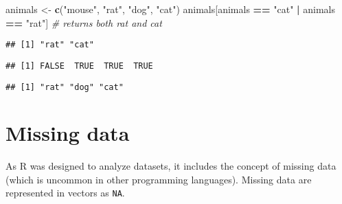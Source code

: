\documentclass[]{book}
\newenvironment{Shaded}{\begin{snugshade}}{\end{snugshade}}
\newcommand{\CommentTok}[1]{\textcolor[rgb]{0.56,0.35,0.01}{\textit{#1}}}
\newcommand{\KeywordTok}[1]{\textcolor[rgb]{0.13,0.29,0.53}{\textbf{#1}}}
\newcommand{\NormalTok}[1]{#1}
\newcommand{\OperatorTok}[1]{\textcolor[rgb]{0.81,0.36,0.00}{\textbf{#1}}}
\newcommand{\StringTok}[1]{\textcolor[rgb]{0.31,0.60,0.02}{#1}}
\begin{document}
\begin{Shaded}
\begin{Highlighting}[]
\NormalTok{animals <-}\StringTok{ }\KeywordTok{c}\NormalTok{(}\StringTok{"mouse"}\NormalTok{, }\StringTok{"rat"}\NormalTok{, }\StringTok{"dog"}\NormalTok{, }\StringTok{"cat"}\NormalTok{)}
\NormalTok{animals[animals }\OperatorTok{==}\StringTok{ "cat"} \OperatorTok{|}\StringTok{ }\NormalTok{animals }\OperatorTok{==}\StringTok{ "rat"}\NormalTok{] }\CommentTok{# returns both rat and cat}
\end{Highlighting}
\end{Shaded}

\begin{verbatim}
## [1] "rat" "cat"
\end{verbatim}

\begin{Shaded}
\end{Shaded}

\begin{verbatim}
## [1] FALSE  TRUE  TRUE  TRUE
\end{verbatim}

\begin{Shaded}
\end{Shaded}

\begin{verbatim}
## [1] "rat" "dog" "cat"
\end{verbatim}

\hypertarget{missing-data}{%
\section{Missing data}\label{missing-data}}

As R was designed to analyze datasets, it includes the concept of missing data (which is uncommon in other programming languages). Missing data are represented in vectors as \texttt{NA}.
\end{document}
